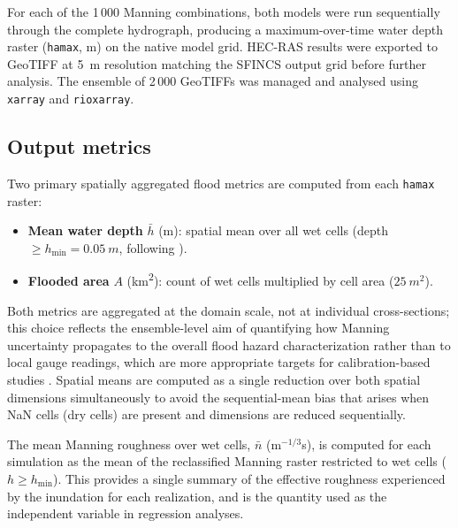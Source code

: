 \documentclass[review,12pt]{elsarticle}
\newcommand{\sfincs}{\textsc{SFINCS}}
\newcommand{\hecras}{\textsc{HEC-RAS}}
\begin{document}
For each of the 1\,000 Manning combinations, both models were run sequentially
through the complete hydrograph, producing a maximum-over-time water depth
raster (\texttt{hamax}, m) on the native model grid.
\hecras{} results were exported to GeoTIFF at 5~m resolution matching the
\sfincs{} output grid before further analysis.
The ensemble of 2\,000 GeoTIFFs was managed and analysed using
\texttt{xarray} and \texttt{rioxarray}.

\subsection{Output metrics}
\label{sec:metrics}

Two primary spatially aggregated flood metrics are computed from each
\texttt{hamax} raster:
\begin{itemize}
  \item \textbf{Mean water depth} $\bar{h}$ (m): spatial mean over all wet
        cells (depth $\geq h_{\min} = \SI{0.05}{m}$, following
        \citealt{wing2019}).
  \item \textbf{Flooded area} $A$ (km\textsuperscript{2}): count of wet cells
        multiplied by cell area ($\SI{25}{m^2}$).
\end{itemize}
Both metrics are aggregated at the domain scale, not at individual
cross-sections; this choice reflects the ensemble-level aim of quantifying
how Manning uncertainty propagates to the overall flood hazard characterization
rather than to local gauge readings, which are more appropriate targets for
calibration-based studies \citep{pappenberger2005, domeneghetti2012}.
Spatial means are computed as a single reduction over both spatial dimensions
simultaneously to avoid the sequential-mean bias that arises when NaN cells
(dry cells) are present and dimensions are reduced sequentially.

The mean Manning roughness over wet cells, $\bar{n}$ (m$^{-1/3}$s), is
computed for each simulation as the mean of the reclassified Manning raster
restricted to wet cells ($h \geq h_{\min}$).
This provides a single summary of the effective roughness experienced by the
inundation for each realization, and is the quantity used as the independent
variable in regression analyses.
\end{document}
